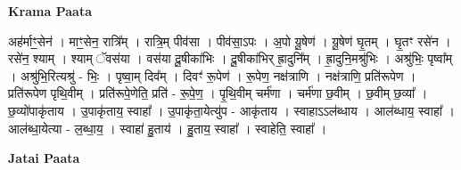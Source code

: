 \documentclass[17pt]{extarticle}
\begin{document}
\textbf{Krama Paata} \newline

अह॑र्माꣳ॒॒सेन॑ । माꣳ॒॒सेन॒ रात्रि᳚म् । रात्रि॒म् पीव॑सा । पीव॑सा॒ऽपः । अ॒पो यू॒षेण॑ । यू॒षेण॑ घृ॒तम् । घृ॒तꣳ रसे॑न । रसे॑न॒ श्याम् । श्याम् ॅवस॑या । वस॑या दू॒षीका॑भिः । दू॒षीका॑भिर् ह्रा॒दुनि᳚म् । ह्रा॒दुनि॒मश्रु॑भिः । अश्रु॑भिः॒ पृष्वा᳚म् । अश्रु॑भि॒रित्यश्रु॑ - भिः॒ । पृष्वा॒म् दिव᳚म् । दिवꣳ॑ रू॒पेण॑ । रू॒पेण॒ नक्ष॑त्राणि । नक्ष॑त्राणि॒ प्रति॑रूपेण । प्रति॑रूपेण पृथि॒वीम् । प्रति॑रूपे॒णेति॒ प्रति॑ - रू॒पे॒ण॒ । पृ॒थि॒वीम् चर्म॑णा । चर्म॑णा छ॒वीम् । छ॒वीम् छ॒व्या᳚ । छ॒व्यो॑पाकृ॑ताय । उ॒पाकृ॑ताय॒ स्वाहा᳚ । उ॒पाकृ॑ता॒येत्यु॑प - आकृ॑ताय । स्वाहाऽऽल॑ब्धाय । आल॑ब्धाय॒ स्वाहा᳚ । आल॑ब्धा॒येत्या - ल॒ब्धा॒य॒ । स्वाहा॑ हु॒ताय॑ । हु॒ताय॒ स्वाहा᳚ । स्वाहेति॒ स्वाहा᳚ । \newline

\textbf{Jatai Paata} \newline
\end{document}

